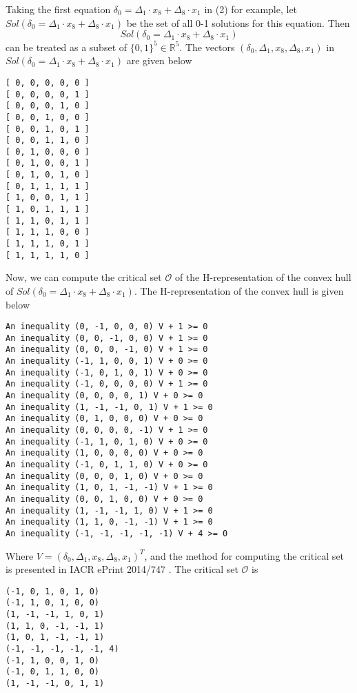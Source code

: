 \documentclass[runningheads]{llncs}
\begin{document}
Taking the first equation $\delta_0    = \Delta_1    \cdot x_8    + \Delta_8    \cdot x_1$ in (2) for example, let $Sol(\delta_0    = \Delta_1    \cdot x_8    + \Delta_8    \cdot x_1)$ be the set of all 0-1 solutions for this equation. Then
$$Sol(\delta_0    = \Delta_1    \cdot x_8    + \Delta_8    \cdot x_1) $$
can be treated as a subset of $\{0,1\}^5 \in \mathbb{R}^5$. The vectors $(\delta_0, \Delta_1, x_8, \Delta_8, x_1)$ in $Sol(\delta_0    = \Delta_1    \cdot x_8    + \Delta_8    \cdot x_1)$ are given below

\begin{verbatim}
[ 0, 0, 0, 0, 0 ]
[ 0, 0, 0, 0, 1 ]
[ 0, 0, 0, 1, 0 ]
[ 0, 0, 1, 0, 0 ]
[ 0, 0, 1, 0, 1 ]
[ 0, 0, 1, 1, 0 ]
[ 0, 1, 0, 0, 0 ]
[ 0, 1, 0, 0, 1 ]
[ 0, 1, 0, 1, 0 ]
[ 0, 1, 1, 1, 1 ]
[ 1, 0, 0, 1, 1 ]
[ 1, 0, 1, 1, 1 ]
[ 1, 1, 0, 1, 1 ]
[ 1, 1, 1, 0, 0 ]
[ 1, 1, 1, 0, 1 ]
[ 1, 1, 1, 1, 0 ]
\end{verbatim}





Now, we can compute the critical set $\mathcal{O}$ of the H-representation of the convex hull of 
$Sol(\delta_0    = \Delta_1    \cdot x_8    + \Delta_8    \cdot x_1) $. The H-representation of the convex hull is given below
\begin{verbatim}
An inequality (0, -1, 0, 0, 0) V + 1 >= 0
An inequality (0, 0, -1, 0, 0) V + 1 >= 0
An inequality (0, 0, 0, -1, 0) V + 1 >= 0
An inequality (-1, 1, 0, 0, 1) V + 0 >= 0
An inequality (-1, 0, 1, 0, 1) V + 0 >= 0
An inequality (-1, 0, 0, 0, 0) V + 1 >= 0
An inequality (0, 0, 0, 0, 1) V + 0 >= 0
An inequality (1, -1, -1, 0, 1) V + 1 >= 0
An inequality (0, 1, 0, 0, 0) V + 0 >= 0
An inequality (0, 0, 0, 0, -1) V + 1 >= 0
An inequality (-1, 1, 0, 1, 0) V + 0 >= 0
An inequality (1, 0, 0, 0, 0) V + 0 >= 0
An inequality (-1, 0, 1, 1, 0) V + 0 >= 0
An inequality (0, 0, 0, 1, 0) V + 0 >= 0
An inequality (1, 0, 1, -1, -1) V + 1 >= 0
An inequality (0, 0, 1, 0, 0) V + 0 >= 0
An inequality (1, -1, -1, 1, 0) V + 1 >= 0
An inequality (1, 1, 0, -1, -1) V + 1 >= 0
An inequality (-1, -1, -1, -1, -1) V + 4 >= 0
\end{verbatim}
Where $V = (\delta_0, \Delta_1, x_8, \Delta_8, x_1)^T$, and the method for computing the critical set is presented in IACR ePrint 2014/747 \cite{cryptoeprint:2014:747}. The critical set $\mathcal{O}$ is 
\begin{verbatim}
(-1, 0, 1, 0, 1, 0)
(-1, 1, 0, 1, 0, 0)
(1, -1, -1, 1, 0, 1)
(1, 1, 0, -1, -1, 1)
(1, 0, 1, -1, -1, 1)
(-1, -1, -1, -1, -1, 4)
(-1, 1, 0, 0, 1, 0)
(-1, 0, 1, 1, 0, 0)
(1, -1, -1, 0, 1, 1)
\end{verbatim}
\end{document}
